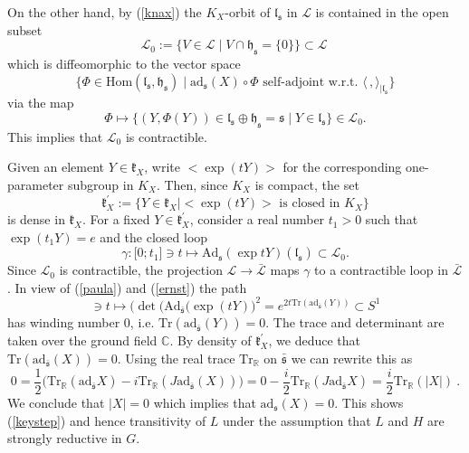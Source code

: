 \documentclass[10]{amsart}
\theoremstyle{remark}
\theoremstyle{definition}
\numberwithin{equation}{section}
\newcommand{\Tr}{\text{Tr}}
\newcommand{\Hom}{\mathrm{Hom}}
\newcommand{\Ad}{\text{Ad}}
\newcommand{\ad}{\text{ad}}
\newcommand{\fh}{{\mathfrak h}}
\newcommand{\fk}{{\mathfrak k}}
\newcommand{\fl}{{\mathfrak l}}
\newcommand{\fs}{{\mathfrak s}}
\newcommand{\beu}{\begin{equation*}}
\newcommand{\IP}[2]{\langle#1\,, #2\rangle}     %
\newcommand{\defn}{{:=}}
\begin{document}
{On the other hand, by (\ref{knax}) the $K_X$-orbit of $\fl_\fs$ in $\mathcal L$ is contained in the open subset
%
\beu 
\mathcal L_0\defn\{ V\in\mathcal L\mid V\cap\fh_\fs=\{0\}\}\subset \mathcal L\ 
\end{equation*}
%
which is diffeomorphic to the vector space 
%
\beu 
\{\Phi\in\Hom(\fl_\fs,\fh_\fs)\mid \ad_\fs (X)\circ\Phi\text{ self-adjoint w.r.t. }\IP{}{}_{|\fl_\fs} \}
\end{equation*}
%
via the map
%
\beu
\Phi\mapsto \{(Y,\Phi(Y))\in\fl_\fs\oplus\fh_\fs=\fs\mid Y\in\fl_\fs\}\in \mathcal L_0.
\end{equation*}
%
This implies that $\mathcal L_0$ is contractible. 

Given an element $Y\in\fk_{X}$, write $<\exp(tY)>$ for the corresponding one-parameter subgroup in $K_{X}$. Then, since $K_{X}$ is compact, the set 
%
\beu
\fk_{X}^{\prime}\defn\{Y\in\fk_{X}\mid <\exp(tY)>\text{ is closed in }K_{X}\}
\end{equation*}
% 
is dense in $\fk_{X}$. For a fixed $Y\in\fk_{X}^{\prime}$, consider a real number $t_{1}>0$ such that $\exp(t_{1}Y)=e$ and the closed loop 
%
\beu
\gamma:\lbrack0;t_{1}\rbrack\ni t\mapsto\Ad_{\fs}(\exp tY)(\fl_{\fs})\subset\mathcal L_0.
\end{equation*}
%
Since $\mathcal L_0$ is contractible, the projection $\mathcal L\rightarrow \bar{\mathcal L}$ maps $\gamma$  to a contractible loop in $\bar{\mathcal L}$. 
In view of (\ref{paula}) and (\ref{ernst})
the path
%
\beu
[0,t_1]\ni t\mapsto \big(\det(\Ad_{\bar\fs}(\exp(tY)\big)^2=e^{2t\Tr(\ad_{\bar\fs} (Y))}
\subset S^1
\end{equation*}
%
has winding number $0$, i.e. $\Tr(\ad_{\bar\fs}(Y))=0$. The trace and determinant are taken over the ground field $\mathbb{C}$. By density of $\fk_{X}^{\prime}$, we deduce that $\Tr(\ad_{\bar\fs} (X))=0$. 
Using the real trace $\Tr_\mathbb{R}$ on $\bar\fs$ we can rewrite this as
%
\beu 
0=\frac{1}{2}\big(\Tr_\mathbb{R} (\ad_{\bar\fs} X) -{i}\Tr_\mathbb{R} (J\ad_{\bar\fs} (X))\big)=0-\frac{{i}}{2}\Tr_\mathbb{R} (J\ad_{\bar\fs} X)=\frac{{i}}{2}\Tr_\mathbb{R} (|X|)\ .
\end{equation*}
%
We conclude that $|X|=0$ which implies that $\ad_\fs (X)=0$.  This shows (\ref{keystep}) and hence transitivity of $L$ under the assumption that $L$ and $H$ are strongly reductive in $G$.

}
\end{document}
